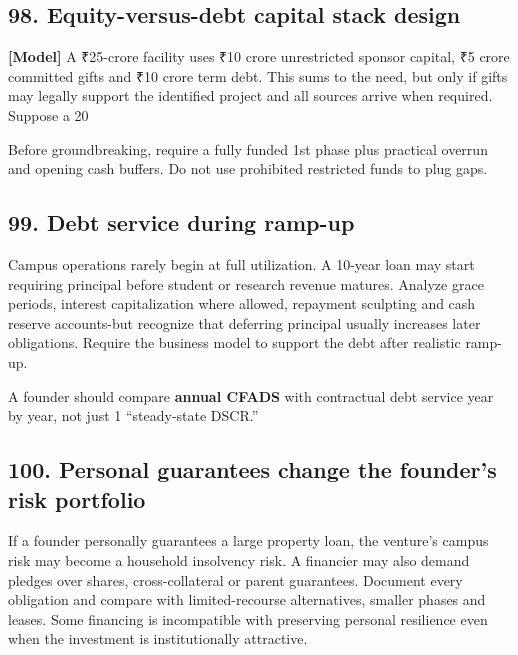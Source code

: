 \subsection{98. Equity-versus-debt capital stack design}

\textbf{[Model]} A \textnormal{₹}25-crore facility uses \textnormal{₹}10 crore unrestricted sponsor capital, \textnormal{₹}5 crore committed gifts and \textnormal{₹}10 crore term debt. This sums to the need, but only if gifts may legally support the identified project and all sources arrive when required. Suppose a 20%

Before groundbreaking, require a fully funded 1st phase plus practical overrun and opening cash buffers. Do not use prohibited restricted funds to plug gaps.


\subsection{99. Debt service during ramp-up}

Campus operations rarely begin at full utilization. A 10-year loan may start requiring principal before student or research revenue matures. Analyze grace periods, interest capitalization where allowed, repayment sculpting and cash reserve accounts-but recognize that deferring principal usually increases later obligations. Require the business model to support the debt after realistic ramp-up.

A founder should compare \textbf{annual CFADS} with contractual debt service year by year, not just 1 ``steady-state DSCR.''


\subsection{100. Personal guarantees change the founder's risk portfolio}

If a founder personally guarantees a large property loan, the venture's campus risk may become a household insolvency risk. A financier may also demand pledges over shares, cross-collateral or parent guarantees. Document every obligation and compare with limited-recourse alternatives, smaller phases and leases. Some financing is incompatible with preserving personal resilience even when the investment is institutionally attractive.

